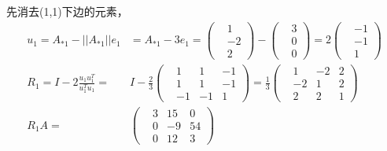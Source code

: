 \documentclass[UTF8,12pt, a4paper]{ctexart}
\begin{document}
  先消去(1,1)下边的元素，
  \begin{align*}
    u_1=A_{*1}-||A_{*1}||e_1&=A_{*1}-3e_1=
    \left(
      \begin{matrix}
        &1 \\
        &-2 \\
        &2
      \end{matrix}
    \right) -
    \left(
      \begin{matrix}
        &3 \\
        &0 \\
        &0
      \end{matrix}
    \right) = 2
    \left(
      \begin{matrix}
        &-1 \\
        &-1 \\
        &1
      \end{matrix}
    \right)  \\
    R_1=I-2\frac{u_1 u_1^T}{u_1^Tu_1}=&
    I-\frac{2}{3}
    \left(
      \begin{matrix}
        &1 &1  &-1  \\
        &1 &1  &-1  \\
        &-1 &-1  &1  
      \end{matrix}
    \right)
    =\frac{1}{3}
    \left(
      \begin{matrix}
        &1 &-2  &2  \\
        &-2 &1  &2  \\
        &2 &2  &1  
      \end{matrix}
    \right)\\
    R_1A =&
    \left(
      \begin{matrix}
        &3 &15  &0  \\
        &0 &-9  &54  \\
        &0 &12  &3  
      \end{matrix}
    \right)
  \end{align*}
\end{document}
